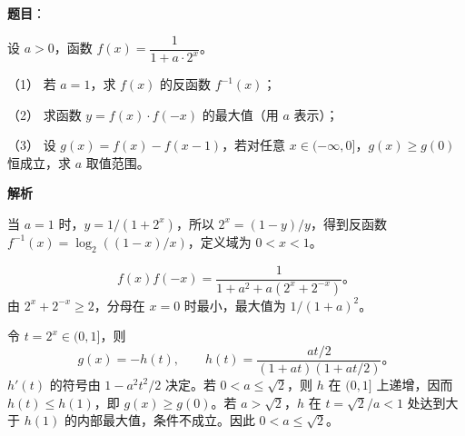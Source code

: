 \begin{answer}

\textbf{题目}：

设 $a>0$，函数 $f(x)=\dfrac{1}{1+a\cdot2^x}$。

（1） 若 $a=1$，求 $f(x)$ 的反函数 $f^{-1}(x)$；

（2） 求函数 $y=f(x)\cdot f(-x)$ 的最大值（用 $a$ 表示）；

（3） 设 $g(x)=f(x)-f(x-1)$，若对任意 $x\in(-\infty,0]$，$g(x)\geq g(0)$ 恒成立，求 $a$ 取值范围。

\textbf{解析}


当 $a=1$ 时，$y=1/(1+2^x)$，所以 $2^x=(1-y)/y$，得到反函数 $f^{-1}(x)=\log_2((1-x)/x)$，定义域为 $0<x<1$。


\nopagebreak[4]
\[
f(x)f(-x)=\frac1{1+a^2+a(2^x+2^{-x})}\mbox{。}
\]
由 $2^x+2^{-x}\geq2$，分母在 $x=0$ 时最小，最大值为 $1/(1+a)^2$。


令 $t=2^x\in(0,1]$，则
\nopagebreak[4]
\[
g(x)=-h(t),\qquad
h(t)=\frac{at/2}{(1+at)(1+at/2)}\mbox{。}
\]
$h'(t)$ 的符号由 $1-a^2t^2/2$ 决定。若 $0<a\leq\sqrt2$，则 $h$ 在 $(0,1]$ 上递增，因而 $h(t)\leq h(1)$，即 $g(x)\geq g(0)$。若 $a>\sqrt2$，$h$ 在 $t=\sqrt2/a<1$ 处达到大于 $h(1)$ 的内部最大值，条件不成立。因此 $0<a\leq\sqrt2$。




\end{answer}
